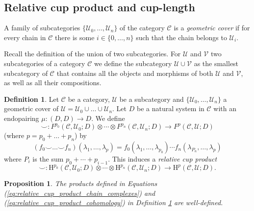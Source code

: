 \documentclass[12pt,reqno]{amsart}
\newtheorem{prop}[teo]{Proposition}
\theoremstyle{definition}
\newtheorem{defi}[teo]{Definition}
\theoremstyle{remark}
\numberwithin{figure}{section}%
\newcommand{\CC}{\mathcal{C}}
\newcommand{\co}{\colon}
\newcommand{\Ho}{\mathrm{H}}
\newcommand{\Uc}{\mathcal{U}}
\newcommand{\Vc}{\mathcal{V}}
\begin{document}
\subsection{Relative cup product and cup-length}



A family of subcategories $\{\Uc_0, \ldots, \Uc_n \}$ of the category $\CC$ is a {\em geometric cover}  if for every chain in $\CC$  there is some $i\in \{0,\ldots,n\}$ such that the chain belongs to $\Uc_i$. 


Recall the definition of the union of two subcategories. For $\Uc$ and $\Vc$ two subcategories of a category $\CC$ we define the subcategory $\Uc \cup \Vc$ as the smallest subcategory of $\CC$ that contains all the objects and morphisms of both $\Uc$ and $\Vc$, as well as all their compositions.


\begin{defi}\label{defi:cup_product_relative}
    Let $\CC$ be a category, $\Uc$ be a subcategory and $\{\Uc_0, \dots, \Uc_n\}$ a geometric cover of $\Uc=\Uc_0 \cup \ldots \cup \Uc_n$. Let $D$ be a natural system in $\CC$ with an endopairing $\mu \colon (D,D) \rightarrow D$. We define \begin{equation}\label{eq:relative_cup_product_chain_complexes}
    \smile\co F^{p_0}(\CC,\Uc_0;D) \otimes \cdots \otimes F^{p_n}(\CC,\Uc_n;D) \rightarrow F^{p}(\CC,\Uc;D)
    \end{equation}
    (where $p=p_0+\dots+p_n$) by $$(f_0 \smile \dots \smile f_n)(\lambda_1,\dots,\lambda_{p})=f_0(\lambda_1,\dots,\lambda_{p_{0}}) \cdots f_n(\lambda_{P_{n}},\dots,\lambda_{p})$$
    where $P_{i}$ is the sum $p_0+\cdots + p_{i-1}$.
    This induces a \emph{relative cup product}
\begin{equation}\label{eq:relative_cup_product_cohomology}
        \smile\co \Ho^{p_0}(\CC,\Uc_0;D) \otimes \cdots \otimes \Ho^{p_n}(\CC,\Uc_n;D) \rightarrow \Ho^{p}(\CC,\Uc;D).
    \end{equation}  
\end{defi}

\begin{prop}\label{rel-cup}\label{VARIOS}
    The products defined in Equations (\ref{eq:relative_cup_product_chain_complexes}) and (\ref{eq:relative_cup_product_cohomology}) in Definition \ref{defi:cup_product_relative} are well-defined. 
\end{prop}
\end{document}
